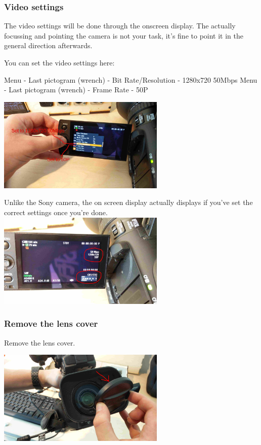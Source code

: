 \documentclass{article}
\begin{document}
\subsubsection{Video settings}
The video settings will be done through the onscreen display. The actually focussing and pointing the camera is not your task, it's fine to point it in the general direction afterwards.

You can set the video settings here:

Menu - Last pictogram (wrench) - Bit Rate/Resolution - 1280x720 50Mbps
Menu - Last pictogram (wrench) - Frame Rate - 50P

\includegraphics[width = 80mm]{Canon05.jpg}

Unlike the Sony camera, the on screen display actually displays if you've set the correct settings once you're done.
\includegraphics[width = 80mm]{Canon06.jpg}

\subsubsection{Remove the lens cover}
Remove the lens cover.

\includegraphics[width = 80mm]{Canon07.jpg}
\end{document}
